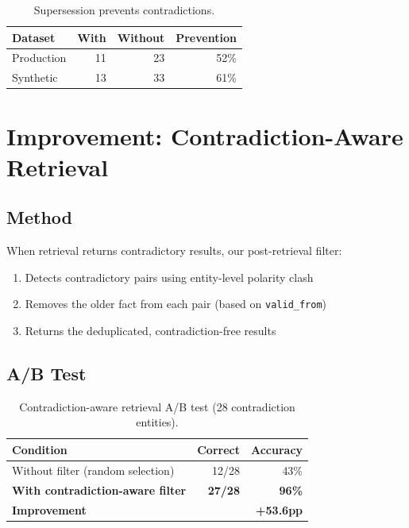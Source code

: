 \documentclass{article}
\begin{document}
\begin{table}[h]
\centering
\caption{Supersession prevents contradictions.}
\begin{tabular}{lrrr}
\toprule
Dataset & With & Without & Prevention \\
\midrule
Production & 11 & 23 & 52\% \\
Synthetic & 13 & 33 & 61\% \\
\bottomrule
\end{tabular}
\end{table}

\section{Improvement: Contradiction-Aware Retrieval}
\label{sec:improve}

\subsection{Method}

When retrieval returns contradictory results, our post-retrieval filter:
\begin{enumerate}
\item Detects contradictory pairs using entity-level polarity clash
\item Removes the older fact from each pair (based on \texttt{valid\_from})
\item Returns the deduplicated, contradiction-free results
\end{enumerate}

\subsection{A/B Test}

\begin{table}[h]
\centering
\caption{Contradiction-aware retrieval A/B test (28 contradiction entities).}
\begin{tabular}{lrr}
\toprule
Condition & Correct & Accuracy \\
\midrule
Without filter (random selection) & 12/28 & 43\% \\
\textbf{With contradiction-aware filter} & \textbf{27/28} & \textbf{96\%} \\
\midrule
\textbf{Improvement} & & \textbf{+53.6pp} \\
\bottomrule
\end{tabular}
\label{tab:ab}
\end{table}
\end{document}
